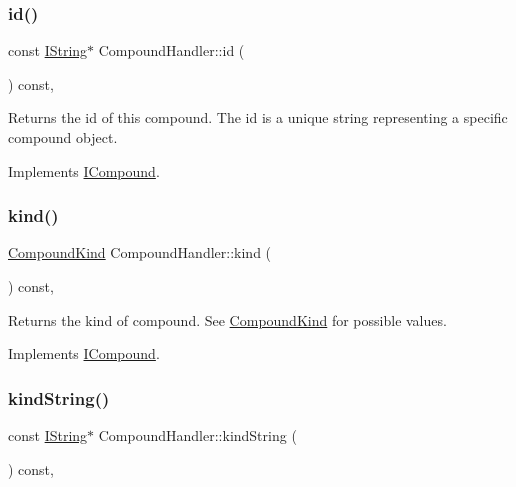 \mbox{\label{class_compound_handler_ae9331f707437a480334f55471922ae13}} 
\subsubsection{\texorpdfstring{id()}{id()}}
{\footnotesize\ttfamily const \mbox{\hyperlink{class_i_string}{I\+String}}$\ast$ Compound\+Handler\+::id (\begin{DoxyParamCaption}{ }\end{DoxyParamCaption}) const\hspace{0.3cm}{\ttfamily [inline]}, {\ttfamily [virtual]}}

Returns the id of this compound. The id is a unique string representing a specific compound object. 

Implements \mbox{\hyperlink{class_i_compound_ac5c371dee7e65324518532b0a58c2d9f}{I\+Compound}}.

\mbox{\label{class_compound_handler_a50629ddd5869657b611c3d170dd39cdb}} 
\subsubsection{\texorpdfstring{kind()}{kind()}}
{\footnotesize\ttfamily \mbox{\hyperlink{class_i_compound_a6b86be2ca9f6759434c1dd8405be328a}{Compound\+Kind}} Compound\+Handler\+::kind (\begin{DoxyParamCaption}{ }\end{DoxyParamCaption}) const\hspace{0.3cm}{\ttfamily [inline]}, {\ttfamily [virtual]}}

Returns the kind of compound. See \mbox{\hyperlink{class_i_compound_a6b86be2ca9f6759434c1dd8405be328a}{Compound\+Kind}} for possible values. 

Implements \mbox{\hyperlink{class_i_compound_ad0d6fb22a48b5bbddae2b88a3cab3640}{I\+Compound}}.

\mbox{\label{class_compound_handler_a8564086585b4054a14ae9548dabed0ca}} 
\subsubsection{\texorpdfstring{kindString()}{kindString()}}
{\footnotesize\ttfamily const \mbox{\hyperlink{class_i_string}{I\+String}}$\ast$ Compound\+Handler\+::kind\+String (\begin{DoxyParamCaption}{ }\end{DoxyParamCaption}) const\hspace{0.3cm}{\ttfamily [inline]}, {\ttfamily [virtual]}}

